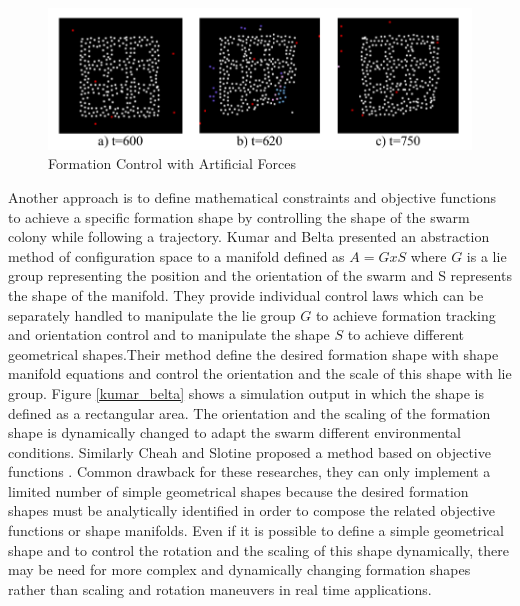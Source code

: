 \begin{figure}[H]
	\caption{Formation Control with Artificial Forces \cite{24}} \label{izgara_ref}
	\centering
	\includegraphics[scale = 0.4]{potential}
\end{figure}


Another approach is to define mathematical constraints and objective functions to achieve a specific formation shape by controlling the shape of the swarm colony while following a trajectory.  Kumar and Belta \cite{25} presented an abstraction method of configuration space to a manifold defined as $A  = G x S$ where $G$ is a lie group representing the position and the orientation of the swarm  and S represents the shape of the manifold.  They provide individual control laws which can be separately handled to manipulate the lie group $G$ to achieve formation tracking and orientation control and to manipulate the shape $S$ to achieve different geometrical shapes.Their method define the desired formation shape with shape manifold equations and control the orientation and the scale of this shape with lie group. Figure \ref{kumar_belta}
shows a simulation output in which the shape is defined as a rectangular area. The orientation and the scaling of the formation shape is dynamically changed to adapt the swarm different environmental conditions. Similarly Cheah and Slotine \cite{8} proposed a method based on objective functions . Common drawback for these researches, they can only implement a limited number of simple geometrical shapes because the desired formation shapes must be analytically identified in order to compose the related objective functions or shape manifolds. Even if it is possible to define a simple geometrical shape and to control the rotation and the scaling of this shape dynamically, there may be need for more complex and dynamically changing formation shapes rather than scaling and rotation maneuvers in real time applications. 



